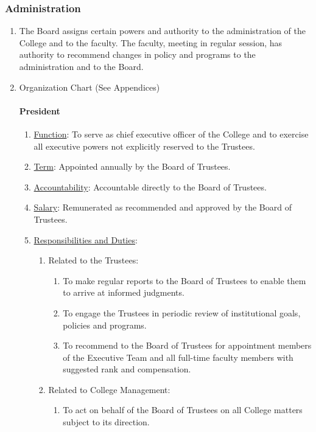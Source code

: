 \documentclass[letterpaper, 11pt]{article}
\begin{document}
		\subsubsection{Administration}
			\begin{enumerate}[label=\alph*)]
				\item{The Board assigns certain powers and authority to the administration of the College and to the faculty. The faculty, meeting in regular session, has authority to recommend changes in policy and programs to the administration and to the Board.}
				\item{Organization Chart (See Appendices)
				\paragraph{President}
					\begin{enumerate}[label=\alph*)]
						\item{\underline{Function}: To serve as chief executive officer of the College and to exercise all executive powers not explicitly reserved to the Trustees.  }
						\item{\underline{Term}: Appointed annually by the Board of Trustees.  }
						\item{\underline{Accountability}: Accountable directly to the Board of Trustees.  }
						\item{\underline{Salary}: Remunerated as recommended and approved by the Board of Trustees.  }
						\item{\underline{Responsibilities and Duties}:
							\begin{enumerate}[label=\arabic*)]
								\item{Related to the Trustees:
									\begin{enumerate}[label=\alph*)]
										\item{To make regular reports to the Board of Trustees to enable them to arrive at informed judgments.}
										\item{To engage the Trustees in periodic review of institutional goals, policies and programs.}
										\item{To recommend to the Board of Trustees for appointment members of the Executive Team and all full-time faculty members with suggested rank and compensation.}
									\end{enumerate}
								}
								\item{Related to College Management:
									\begin{enumerate}[label=\alph*)]
										\item{To act on behalf of the Board of Trustees on all College matters subject to its direction.}

\end{enumerate}}
\end{enumerate}}
\end{enumerate}}
\end{enumerate}
\end{document}
